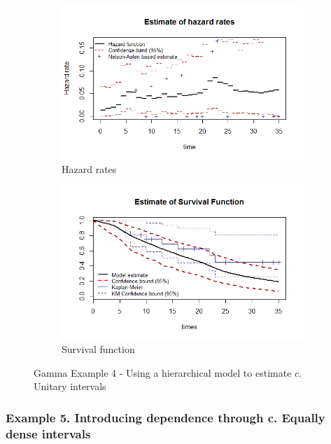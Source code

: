 \documentclass[letterpaper]{article}\usepackage[]{graphicx}\usepackage[]{xcolor}
\begin{document}
\begin{figure}
  \centering
  \begin{subfigure}[a]{\textwidth}\centering
    \includegraphics[width=\textwidth]{G41.png}
    \caption{Hazard rates}
  \end{subfigure}
  \begin{subfigure}[b]{\textwidth}\centering
    \includegraphics[width=\textwidth]{G42.png}
    \caption{Survival function}
  \end{subfigure}
  \caption{Gamma Example 4 - Using a hierarchical model to estimate $c$. Unitary intervals}
  \label{fig:G4}
\end{figure}

\subsubsection{Example 5. Introducing dependence through c. Equally dense intervals}
\end{document}
